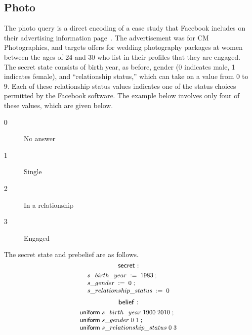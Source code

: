 \subsection{Photo}

The photo query is a direct encoding of a case study that Facebook
includes on their advertising information
page~\cite{wedding-case-study}.  The advertisement was for CM
Photographics, and targets offers for wedding photography packages at
women between the ages of 24 and 30 who list in their profiles that
they are engaged.  The secret state consists of birth year, as before,
gender (0 indicates male, 1 indicates female), and ``relationship
status,'' which can take on a value from 0 to 9.  Each of these
relationship status values indicates one of the status choices
permitted by the Facebook software.  The example below involves only
four of these values, which are given below.
\begin{description}
\item[0] No answer
\item[1] Single
\item[2] In a relationship
\item[3] Engaged
\end{description}
The secret state and prebelief are as follows.
$$ \mathsf{secret}: $$
\begin{displaymath}{\small
\begin{array}{l}
  {s\text{\_}birth\text{\_}year}\;:=\;{1983}\; ;\\
  {s\text{\_}gender}\;:=\;{0}\; ;\\
  {s\text{\_}relationship\text{\_}status}\;:=\;{0}\\
\end{array}
}
\end{displaymath}
$$ \mathsf{belief}: $$
\begin{displaymath}{\small
\begin{array}{l}
  \mathsf{uniform}\;{s\text{\_}birth\text{\_}year}\;{1900}\;2010\; ;\\
  \mathsf{uniform}\;{s\text{\_}gender}\;{0}\;1\; ;\\
  \mathsf{uniform}\;{s\text{\_}relationship\text{\_}status}\;{0}\;3\\
\end{array}
}
\end{displaymath}

